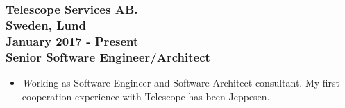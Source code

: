\documentclass[10pt,a4paper]{article}
\begin{document}
\subsubsection{{\large Telescope Services AB.} \\ \textnormal{Sweden, Lund} \\ \textnormal{January 2017 - Present} \\ {Senior Software Engineer/Architect}}
  \setlength{\leftskip}{0.5cm}
  \setlength{\rightskip}{1cm}
  \begin{itemize}
    \setlength{\rightskip}{1cm}
    \setlength\itemsep{0em}
    \item \small \textit Working as Software Engineer and Software Architect consultant. My first cooperation experience with Telescope has been Jeppesen.
  \end{itemize}
  \setlength{\leftskip}{0pt}
  \setlength{\rightskip}{0cm}
  
\end{document}
